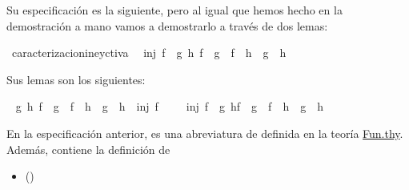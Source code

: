 \begin{isabellebody}
\begin{isamarkuptext}
  Su especificación es la siguiente, pero al igual que hemos hecho en la demostración
a mano vamos a demostrarlo a través de dos lemas:%
\end{isamarkuptext}\isamarkuptrue%
\isamarkupfalse%
\ caracterizacionineyctiva{\isacharcolon}\isanewline
\ \ {\isachardoublequoteopen}inj\ f\ {\isasymlongleftrightarrow}\ {\isacharparenleft}{\isasymforall}g\ h{\isachardot}\ {\isacharparenleft}f\ {\isasymcirc}\ g\ {\isacharequal}\ f\ {\isasymcirc}\ h{\isacharparenright}\ {\isasymlongrightarrow}\ {\isacharparenleft}g\ {\isacharequal}\ h{\isacharparenright}{\isacharparenright}{\isachardoublequoteclose}\isanewline
%
\isadelimproof
\ \ %
\endisadelimproof
%
\isatagproof
{}\isamarkupfalse%
%
\endisatagproof
{\isafoldproof}%
%
\isadelimproof
%
\endisadelimproof
%
\begin{isamarkuptext}%
Sus lemas son los siguientes:%
\end{isamarkuptext}\isamarkuptrue%
\isamarkupfalse%
\ \isanewline
{\isachardoublequoteopen}{\isasymforall}g\ h{\isachardot}\ {\isacharparenleft}f\ {\isasymcirc}\ g\ {\isacharequal}\ f\ {\isasymcirc}\ h\ {\isasymlongrightarrow}\ g\ {\isacharequal}\ h{\isacharparenright}\ {\isasymLongrightarrow}\ inj\ f{\isachardoublequoteclose}\isanewline
%
\isadelimproof
\ \ %
\endisadelimproof
%
\isatagproof
{}\isamarkupfalse%
%
\endisatagproof
{\isafoldproof}%
%
\isadelimproof
\isanewline
%
\endisadelimproof
\isanewline
{}\isamarkupfalse%
\ \isanewline
{\isachardoublequoteopen}inj\ f\ {\isasymLongrightarrow}\ {\isacharparenleft}{\isasymforall}g\ h{\isachardot}{\isacharparenleft}f\ {\isasymcirc}\ g\ {\isacharequal}\ f\ {\isasymcirc}\ h{\isacharparenright}\ {\isasymlongrightarrow}\ {\isacharparenleft}g\ {\isacharequal}\ h{\isacharparenright}{\isacharparenright}{\isachardoublequoteclose}\isanewline
%
\isadelimproof
\ \ %
\endisadelimproof
%
\isatagproof
{}\isamarkupfalse%
%
\endisatagproof
{\isafoldproof}%
%
\isadelimproof
%
\endisadelimproof
%
\begin{isamarkuptext}%
En la especificación anterior,  es una 
  abreviatura de  definida en la teoría
  \href{http://bit.ly/2XuPQx5}{Fun.thy}. Además, contiene la definición
  de 
  \begin{itemize}
    \item[]  \hfill ()

\end{itemize}
\end{isamarkuptext}
\end{isabellebody}
